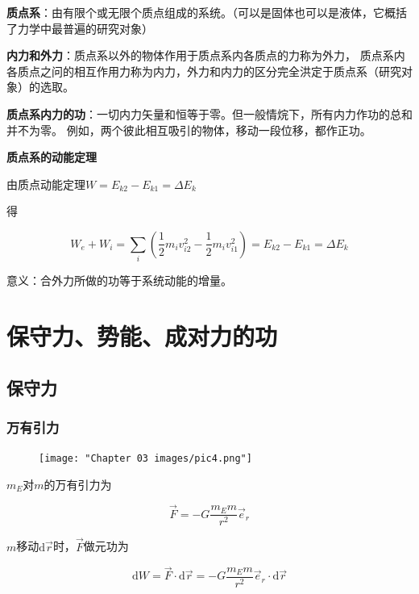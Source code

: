 \documentclass[
	12pt, %
	a4paper, %
]{myLegrandOrangeBook}
\newcommand{\rmd}{\mathrm{d}}
\begin{document}
    \textbf{质点系}：由有限个或无限个质点组成的系统。（可以是固体也可以是液体，它概括了力学中最普遍的研究对象）

    \textbf{内力和外力}：质点系以外的物体作用于质点系内各质点的力称为外力，
    质点系内各质点之问的相互作用力称为内力，外力和内力的区分完全洪定于质点系（研究对象）的选取。

    \textbf{质点系内力的功}：一切内力矢量和恒等于零。但一般情烷下，所有内力作功的总和并不为零。
    例如，两个彼此相互吸引的物体，移动一段位移，都作正功。

    \textbf{质点系的动能定理}

    由质点动能定理$W=E_{k 2}-E_{k 1}=\Delta E_k$

    得

    \begin{equation}
        W_e+W_i=\sum_i\left(\frac{1}{2} m_i v_{i 2}^2-\frac{1}{2} m_i v_{i 1}^2\right)=E_{k 2}-E_{k 1}=\Delta E_k
    \end{equation}

    意义：合外力所做的功等于系统动能的增量。

    \section{保守力、势能、成对力的功}

    \subsection{保守力}

    \subsubsection*{万有引力}

    \begin{figure}
        \centering
        \texttt{[image: "Chapter 03 images/pic4.png"]}
        \label{pic4}
    \end{figure}

    \(m_{E}\)对\(m\)的万有引力为

    $$
        \overrightarrow{F}=-G \frac{m_{E} m}{r^2} \overrightarrow{e}_r
    $$

    \(m\)移动\(\rmd \overrightarrow{r}\)时，\(\overrightarrow{F}\)做元功为

    $$
        \rmd W = \overrightarrow{F} \cdot \rmd \overrightarrow{r}
        =-G \frac{m_{E} m}{r^2} \overrightarrow{e}_r \cdot \rmd \overrightarrow{r}
    $$
\end{document}
